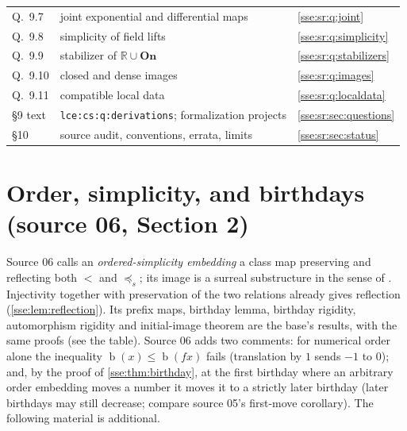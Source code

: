\documentclass[11pt,a4paper]{article}
\numberwithin{equation}{section}
\theoremstyle{plain}
\theoremstyle{definition}
\theoremstyle{remark}
\newcommand{\On}{\mathbf{On}}
\newcommand{\R}{\mathbb{R}}
\newcommand{\bday}{\operatorname{b}}
\newcommand{\pref}{\preccurlyeq_s}
\newcommand{\lbl}[1]{\nolinkurl{#1}}%
\begin{document}
\begin{longtable}{P{17mm}P{52mm}P{79mm}}
Q.~9.7 & joint exponential and differential maps & \cref{sse:sr:q:joint} \\
Q.~9.8 & simplicity of field lifts & \cref{sse:sr:q:simplicity} \\
Q.~9.9 & stabilizer of $\R\cup\On$ & \cref{sse:sr:q:stabilizers} \\
Q.~9.10 & closed and dense images & \cref{sse:sr:q:images} \\
Q.~9.11 & compatible local data & \cref{sse:sr:q:localdata} \\
\S9 text & \lbl{lce:cs:q:derivations}; formalization projects & \cref{sse:sr:sec:questions} \\
\S10 & source audit, conventions, errata, limits & \cref{sse:sr:sec:status} \\
\bottomrule
\end{longtable}
\endgroup

\section{Order, simplicity, and birthdays (source 06, Section 2)}\label{sse:sr:sec:order}

Source 06 calls an \emph{ordered-simplicity embedding} a class map preserving
and reflecting both $<$ and $\pref$; its image is a surreal substructure in
the sense of \cite{BVH}. Injectivity together with preservation of the two
relations already gives reflection (\cref{sse:lem:reflection}). Its prefix
maps, birthday lemma, birthday rigidity, automorphism rigidity and
initial-image theorem are the base's results, with the same proofs
(see the table). Source 06 adds two comments: for numerical order alone the
inequality $\bday(x)\le\bday(fx)$ fails (translation by $1$ sends $-1$ to $0$);
and, by the proof of \cref{sse:thm:birthday}, at the first birthday where an
arbitrary order embedding moves a number it moves it to a strictly later
birthday (later birthdays may still decrease; compare source 05's first-move
corollary). The following material is additional.
\end{document}
